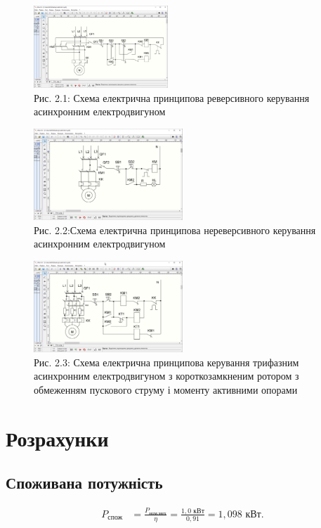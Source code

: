 \documentclass[a4paper]{article}
\begin{document}
\begin{figure}[h]
    \centering
    \includegraphics[width=0.45\textwidth]{imgs/LW2.1.png}
    \caption*{Рис. 2.1: Схема електрична принципова реверсивного керування асинхронним електродвигуном}
\end{figure} 

\begin{figure}[h]
    \centering
    \includegraphics[width=0.5\textwidth]{imgs/LW2.2.png}
    \caption*{Рис. 2.2:Схема електрична принципова нереверсивного керування асинхронним електродвигуном}
\end{figure} 

\begin{figure}[h]
    \centering
    \includegraphics[width=0.5\textwidth]{imgs/LW2.3.png}
    \caption*{Рис. 2.3: Схема електрична принципова керування трифазним асинхронним електродвигуном з короткозамкненим ротором з обмеженням  пускового струму і моменту активними опорами}
\end{figure} 

    \section*{Розрахунки}

\subsection*{Споживана потужність}
\begin{align*}
    P_{\text{спож}} &= \frac{P_{\text{ном.мех}}}{\eta} = \frac{1,0 \text{ кВт}}{0,91} = 1,098 \text{ кВт}.
\end{align*}
\end{document}
